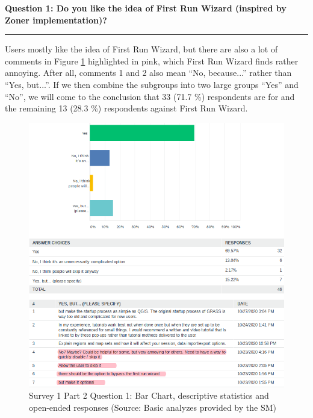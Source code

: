 \documentclass[a4paper,10pt,twoside]{article}
\begin{document}
\newpage
\noindent \textbf{Question 1: Do you like the idea of First Run Wizard (inspired by Zoner implementation)?}
\par\noindent\rule{\textwidth}{0.4pt}

\noindent Users mostly like the idea of First Run Wizard, but there are also a lot of comments in Figure \ref{fig:survey1_part2_question1_all} highlighted in pink, which First Run Wizard finds rather annoying. After all, comments 1 and 2 also mean ``No, because...'' rather than ``Yes, but...''. If we then combine the subgroups into two large groups ``Yes'' and ``No'', we will come to the conclusion that 33 (71.7 \%) respondents are for and the remaining 13 (28.3 \%) respondents against First Run Wizard.

\vspace{0.3cm}
\begin{figure}[hbt!] 
\begin{center}
\includegraphics[width=15cm]{../surveys/analyzed_data/survey1_part2_question1_all.png} 
\caption[Survey 1 Part 2 Question 1: Bar Chart, descriptive statistics and open-ended responses]{Survey 1 Part 2 Question 1: Bar Chart, descriptive statistics and open-ended responses (Source: Basic analyzes provided by the SM)}
\label{fig:survey1_part2_question1_all}
\end{center}
\end{figure}
\end{document}
